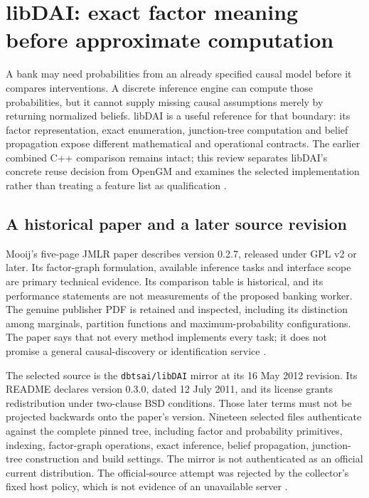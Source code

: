 \section{libDAI: exact factor meaning before approximate computation}
\label{sec:exec24-libdai-reuse}

A bank may need probabilities from an already specified causal model before
it compares interventions. A discrete inference engine can compute those
probabilities, but it cannot supply missing causal assumptions merely by
returning normalized beliefs. libDAI is a useful reference for that boundary:
its factor representation, exact enumeration, junction-tree computation and
belief propagation expose different mathematical and operational contracts.
The earlier combined C++ comparison remains intact; this review separates
libDAI's concrete reuse decision from OpenGM and examines the selected
implementation rather than treating a feature list as qualification
\citep{exec13_cxx_inference,exec24_libdai_source}.

\subsection{A historical paper and a later source revision}
Mooij's five-page JMLR paper describes version 0.2.7, released under GPL v2 or
later. Its factor-graph formulation, available inference tasks and interface
scope are primary technical evidence. Its comparison table is historical,
and its performance statements are not measurements of the proposed banking
worker. The genuine publisher PDF is retained and inspected, including its
distinction among marginals, partition functions and maximum-probability
configurations. The paper says that not every method implements every task;
it does not promise a general causal-discovery or identification service
\citep{exec24_libdai_paper}.

The selected source is the \texttt{dbtsai/libDAI} mirror at its 16 May 2012
revision. Its README declares version 0.3.0, dated 12 July 2011, and its
license grants redistribution under two-clause BSD conditions. Those later
terms must not be projected backwards onto the paper's version. Nineteen
selected files authenticate against the complete pinned tree, including
factor and probability primitives, indexing, factor-graph operations, exact
inference, belief propagation, junction-tree construction and build settings.
The mirror is not authenticated as an official current distribution. The
official-source attempt was rejected by the collector's fixed host policy,
which is not evidence of an unavailable server
\citep{exec24_libdai_source,exec24_libdai_choice}.

